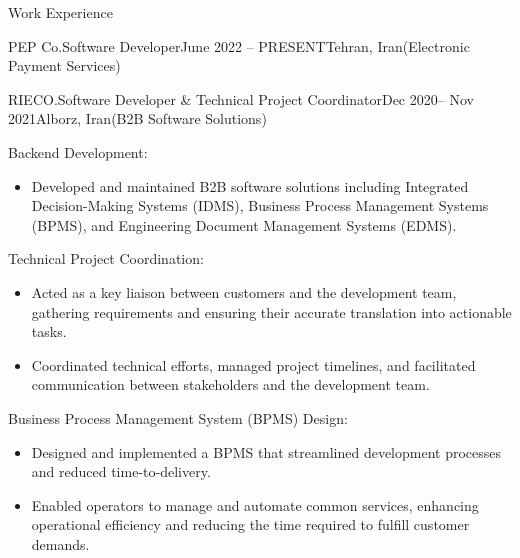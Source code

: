 \documentclass[]{kyvernitis-resume}
\begin{document}
\begin{section}{Work Experience}
\begin{subsection}{PEP Co.}{Software Developer}{June 2022 -- PRESENT}{Tehran, Iran}{(Electronic Payment Services)}
    \end{subsection}

\hfill

 \begin{subsection}{RIECO.}{Software Developer  \& Technical Project Coordinator}{Dec 2020-- Nov 2021}{Alborz, Iran}{(B2B Software Solutions)}
	\item Backend Development:
		\begin{itemize}
			\item Developed and maintained B2B software solutions including Integrated Decision-Making Systems (IDMS), Business Process Management Systems (BPMS), and Engineering Document Management Systems (EDMS).
		\end{itemize}

	\item Technical Project Coordination:
		\begin{itemize}
			\item Acted as a key liaison between customers and the development team, gathering requirements and ensuring their accurate translation into actionable tasks.
			\item Coordinated technical efforts, managed project timelines, and facilitated communication between stakeholders and the development team.
		\end{itemize}

	\item Business Process Management System (BPMS) Design:
		\begin{itemize}
			\item Designed and implemented a BPMS that streamlined development processes and reduced time-to-delivery.
			\item Enabled operators to manage and automate common services, enhancing operational efficiency and reducing the time required to fulfill customer demands.
		\end{itemize}
	

\end{subsection}
\end{section}
\end{document}
